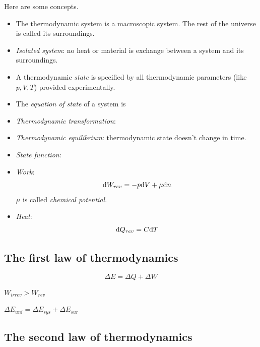 Here are some concepts.
\begin{itemize}
	\item The thermodynamic system is a macroscopic system. The rest of the universe is called its surroundings.
	\item \textit{Isolated system}: no heat or material is exchange between a system and its surroundings.
	\item A thermodynamic \textit{state} is specified by all thermodynamic parameters (like $p, V, T$) provided experimentally.
	\item The \textit{equation of state} of a system is 
	\item \textit{Thermodynamic transformation}: 
	\item \textit{Thermodynamic equilibrium}: thermodynamic state doesn't change in time.
	\item \textit{State function}:
	\item \textit{Work}: 
		\begin{equation}
			\mathrm{d} W_{rev}=-p\mathrm{d} V+\mu\mathrm{d} n
		\end{equation}
		$\mu$ is called \textit{chemical potential}.
	\item \textit{Heat}:
		\begin{equation}
			\mathrm{d} Q_{rev}=C\mathrm{d} T
		\end{equation}
\end{itemize}

\subsection{The first law of thermodynamics}


\begin{equation}
	\Delta E=\Delta Q+\Delta W
\end{equation}

$W_{irrev}>W_{rev}$

$\Delta E_{uni}=\Delta E_{sys}+\Delta E_{sur}$

\subsection{The second law of thermodynamics}

